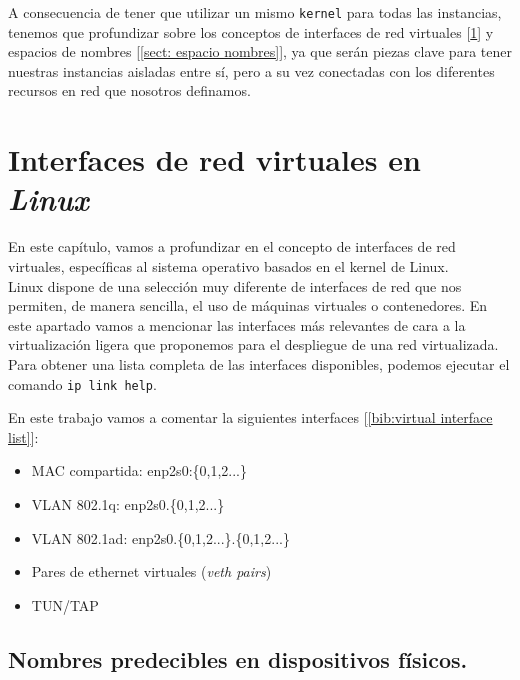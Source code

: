 \documentclass[a4paper, oneside, 12pt]{book}
\begin{document}
	\noindent A consecuencia de tener que utilizar un mismo \texttt{kernel} para todas las instancias, tenemos que profundizar sobre los conceptos de interfaces de red virtuales [\ref{sect: interfaces virtuales}] y espacios de nombres [\ref{sect: espacio nombres}], ya que serán piezas clave para tener nuestras instancias aisladas entre sí, pero a su vez conectadas con los diferentes recursos en red que nosotros definamos.
	
	\pagebreak
	
	\chapter{Interfaces de red virtuales en \textit{Linux}}
	\label{sect: interfaces virtuales}
	
	\noindent En este capítulo, vamos a profundizar en el concepto de interfaces de red virtuales, específicas al sistema operativo basados en el kernel de Linux. \\
	
	\noindent Linux dispone de una selección muy diferente de interfaces de red que nos permiten, de manera sencilla, el uso de máquinas virtuales o contenedores. En este apartado vamos a mencionar las interfaces más relevantes de cara a la virtualización ligera que proponemos para el despliegue de una red virtualizada. Para obtener una lista completa de las interfaces disponibles, podemos ejecutar el comando \texttt{ip link help}.\\
	
	\par \noindent En este trabajo vamos a comentar la siguientes interfaces [\ref{bib:virtual interface list}]:
	\begin{itemize}
		\item MAC compartida: enp2s0:\{0,1,2...\}
		\item VLAN 802.1q: enp2s0.\{0,1,2...\}
		\item VLAN 802.1ad: enp2s0.\{0,1,2...\}.\{0,1,2...\}
		\item Pares de ethernet virtuales (\textit{veth pairs})
		\item TUN/TAP
	\end{itemize}


	\section[Nombrado predecible de dispositivos]{Nombres predecibles en dispositivos físicos.}
	
\end{document}
